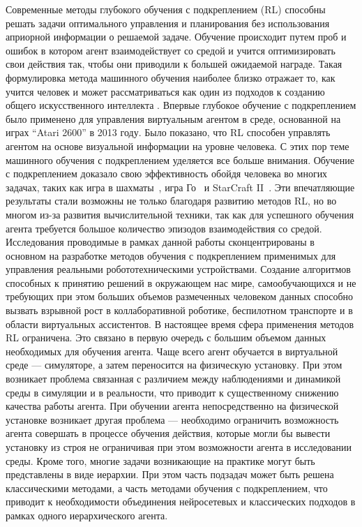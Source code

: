 Современные методы глубокого обучения с подкреплением (RL) способны решать задачи оптимального управления и планирования без использования априорной информации о решаемой задаче. Обучение происходит путем проб и ошибок в котором агент взаимодействует со средой и учится оптимизировать свои действия так, чтобы они приводили к большей ожидаемой награде. Такая формулировка метода машинного обучения наиболее близко отражает то, как учится человек и может рассматриваться как один из подходов к созданию общего искусственного интеллекта \cite{reward_is_enough}. Впервые глубокое обучение с подкреплением было применено для управления виртуальным агентом в среде, основанной на играх ``Atari 2600'' в 2013 году\cite{mnih2013atari}. Было показано, что RL способен управлять агентом на основе визуальной информации на уровне человека. С этих пор теме машинного обучения с подкреплением уделяется все больше внимания. Обучение с подкреплением доказало свою эффективность обойдя человека во многих задачах, таких как игра в шахматы~\cite{alphazero}, игра Го~\cite{alphago} и StarCraft II~\cite{alphastar}. Эти впечатляющие результаты стали возможны не только благодаря развитию методов RL, но во многом из-за развития вычислительной техники, так как для успешного обучения агента требуется большое количество эпизодов взаимодействия со средой. Исследования проводимые в рамках данной работы сконцентрированы в основном на разработке методов обучения с подкреплением применимых для управления реальными робототехническими устройствами. Создание алгоритмов способных к принятию решений в окружающем нас мире, самообучающихся и не требующих при этом больших объемов размеченных человеком данных способно вызвать взрывной рост в коллаборативной роботике, беспилотном транспорте и в области виртуальных ассистентов.
В настоящее время сфера применения методов RL ограничена. Это связано в первую очередь с большим объемом данных необходимых для обучения агента. Чаще всего агент обучается в виртуальной среде --- симуляторе, а затем переносится на физическую установку. При этом возникает проблема связанная с различием между наблюдениями и динамикой среды в симуляции и в реальности, что приводит к существенному снижению качества работы агента. При обучении агента непосредственно на физической установке возникает другая проблема --- необходимо ограничить возможность агента совершать в процессе обучения действия, которые могли бы вывести установку из строя не ограничивая при этом возможности агента в исследовании среды. Кроме того, многие задачи возникающие на практике могут быть представлены в виде иерархии. При этом часть подзадач может быть решена классическими методами, а часть методами обучения с подкреплением, что приводит к необходимости объединения нейросетевых и классических подходов в рамках одного иерархического агента. 


